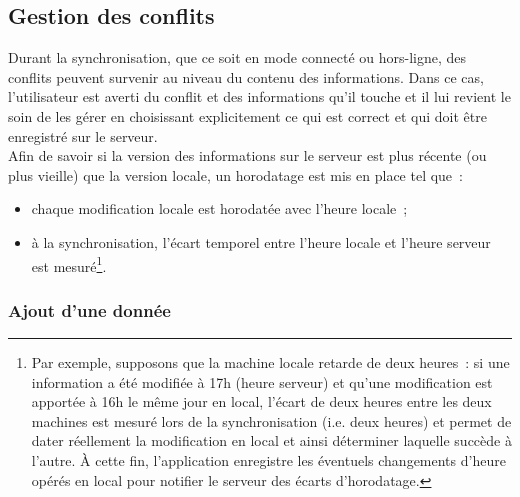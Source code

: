 \subsection{Gestion des conflits}
Durant la synchronisation, que ce soit en mode connecté ou hors-ligne, des conflits peuvent survenir au niveau du contenu des informations.
Dans ce cas, l'utilisateur est averti du conflit et des informations qu'il touche et il lui revient le soin de les gérer en choisissant explicitement ce qui est correct et qui doit être enregistré sur le serveur.
\\
Afin de savoir si la version des informations sur le serveur est plus récente (ou plus vieille) que la version locale, un horodatage est mis en place tel que~:
\begin{itemize}
    \item chaque modification locale est horodatée avec l'heure locale~;
    \item à la synchronisation, l'écart temporel entre l'heure locale et l'heure serveur est mesuré\footnote{Par exemple, supposons que la machine locale retarde de deux heures~: si une information a été modifiée à 17h (heure serveur) et qu'une modification est apportée à 16h le même jour en local, l'écart de deux heures entre les deux machines est mesuré lors de la synchronisation (i.e. deux heures) et permet de dater réellement la modification en local et ainsi déterminer laquelle succède à l'autre. À cette fin, l'application enregistre les éventuels changements d'heure opérés en local pour notifier le serveur des écarts d'horodatage.}.
\end{itemize}

\subsubsection{Ajout d'une donnée}

